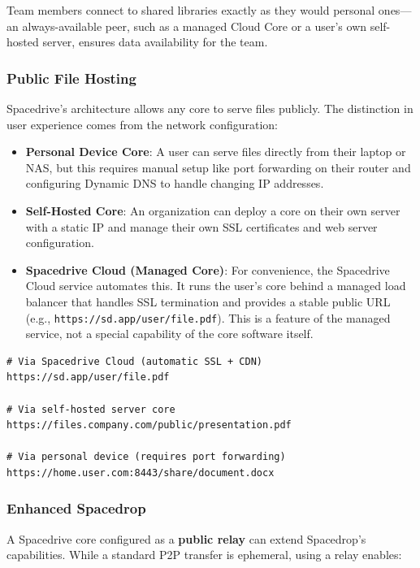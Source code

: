 \documentclass[sigconf]{acmart}
\begin{document}
Team members connect to shared libraries exactly as they would personal ones—an always-available peer, such as a managed Cloud Core or a user's own self-hosted server, ensures data availability for the team.

\subsubsection{Public File Hosting}

Spacedrive's architecture allows any core to serve files publicly. The distinction in user experience comes from the network configuration:

\begin{itemize}
    \item \textbf{Personal Device Core}: A user can serve files directly from their laptop or NAS, but this requires manual setup like port forwarding on their router and configuring Dynamic DNS to handle changing IP addresses.
    \item \textbf{Self-Hosted Core}: An organization can deploy a core on their own server with a static IP and manage their own SSL certificates and web server configuration.
    \item \textbf{Spacedrive Cloud (Managed Core)}: For convenience, the Spacedrive Cloud service automates this. It runs the user's core behind a managed load balancer that handles SSL termination and provides a stable public URL (e.g., \texttt{https://\allowbreak sd.app/\allowbreak user/\allowbreak file.pdf}). This is a feature of the managed service, not a special capability of the core software itself.
\end{itemize}

\begin{lstlisting}[style=shellstyle, language=text, caption=Public sharing URL examples]
# Via Spacedrive Cloud (automatic SSL + CDN)
https://sd.app/user/file.pdf

# Via self-hosted server core
https://files.company.com/public/presentation.pdf

# Via personal device (requires port forwarding)
https://home.user.com:8443/share/document.docx
\end{lstlisting}

\subsubsection{Enhanced Spacedrop}

A Spacedrive core configured as a \textbf{public relay} can extend Spacedrop's capabilities. While a standard P2P transfer is ephemeral, using a relay enables:
\end{document}
